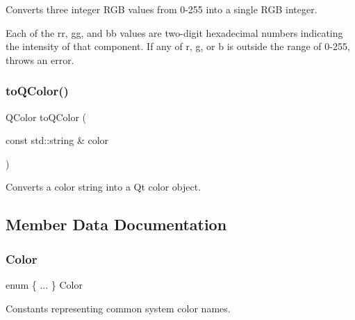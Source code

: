 Converts three integer R\+GB values from 0-\/255 into a single R\+GB integer. 

Each of the {\ttfamily rr}, {\ttfamily gg}, and {\ttfamily bb} values are two-\/digit hexadecimal numbers indicating the intensity of that component. If any of r, g, or b is outside the range of 0-\/255, throws an error. \mbox{\label{classGColor_a23f62da01b905b62266904a01cfb3745}} 
\subsubsection{\texorpdfstring{to\+Q\+Color()}{toQColor()}}
{\footnotesize\ttfamily Q\+Color to\+Q\+Color (\begin{DoxyParamCaption}\item[{const std\+::string \&}]{color }\end{DoxyParamCaption})\hspace{0.3cm}{\ttfamily [static]}}



Converts a color string into a Qt color object. 



\subsection{Member Data Documentation}
\mbox{\label{classGColor_a829e668b6af432af22e4fe68feff8c9a}} 
\subsubsection{\texorpdfstring{Color}{Color}}
{\footnotesize\ttfamily enum \{ ... \}   Color}



Constants representing common system color names. 

